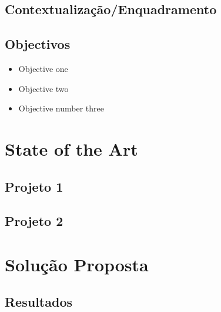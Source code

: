 \documentclass[twocolumn,twoside,11pt]{article}
\begin{document}
\subsection{Contextualização/Enquadramento} %
\label{sub:contextualiza_o_enquadramento}
\lipsum[2]

\subsection{Objectivos} %
\label{sub:objectivos}
\begin{itemize}
  \item Objective one
  \item Objective two
  \item Objective number three
\end{itemize}


\section{State of the Art} %
\label{sec:state_of_the_art}

\lipsum[3]


\subsection{Projeto 1} %
\label{sub:projeto_1}
\lipsum[2]


\subsection{Projeto 2} %
\label{sub:projeto_2}



\lipsum[7]

\section{Solução Proposta} %
\label{sec:solucao}

\lipsum[8]

\subsection{Resultados} %
\label{sub:resultados}
\lipsum[3]
\end{document}
